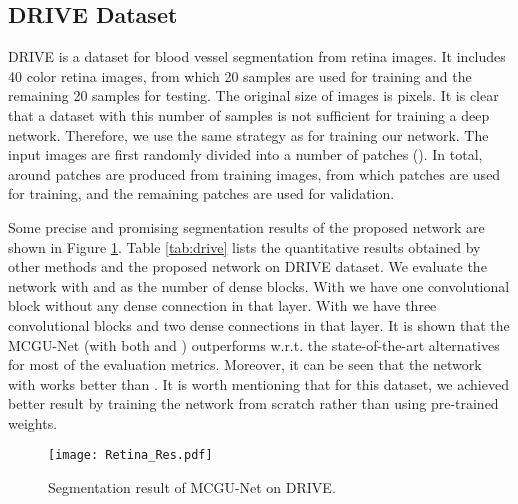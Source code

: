 \documentclass[journal]{IEEEtran}
\begin{document}
\subsection{DRIVE Dataset}

DRIVE \cite{staal2004} is a dataset for blood vessel segmentation from retina images. It includes 40 color retina images, from which 20 samples are used for training and the remaining 20 samples for testing. The original size of images is  pixels. It is clear that a dataset with this number of samples is not sufficient for training a deep network. Therefore, we use the same strategy as \cite{alom2018} for training our network. The input images are first randomly divided into a number of patches (). In total, around  patches are produced from  training images, from which  patches are used for training, and the remaining  patches are used for validation. 



Some precise and promising segmentation results of the proposed network are shown in Figure \ref{fig:DRIVE_R}. Table \ref{tab:drive} lists the quantitative results obtained by other methods and the proposed network on DRIVE dataset. We evaluate the network with  and  as the number of dense blocks. With  we have one convolutional block without any dense connection in that layer. With  we have three convolutional blocks and two dense connections in that layer. 
It is shown that the MCGU-Net (with both  and ) outperforms w.r.t. the state-of-the-art alternatives for most of the evaluation metrics. Moreover, it can be seen that the network with  works better than . It is worth mentioning that for this dataset, we achieved better result by training the network from scratch rather than using pre-trained weights.

\begin{figure}
\centering
\texttt{[image: Retina\_Res.pdf]}
\caption{Segmentation result of MCGU-Net on DRIVE.} 
\vspace*{-0.5\baselineskip}
\label{fig:DRIVE_R}
\end{figure}
\end{document}
